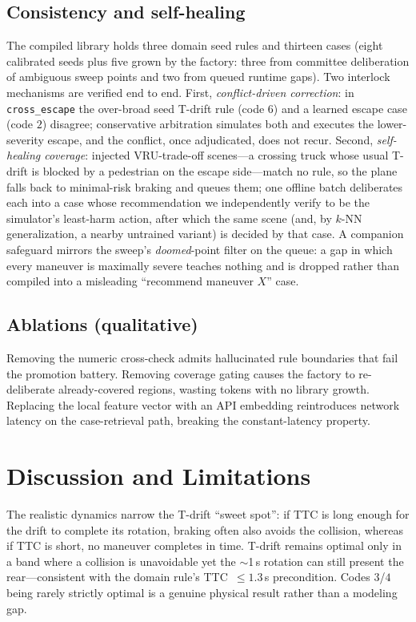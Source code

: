\documentclass[conference]{IEEEtran}
\begin{document}
\subsection{Consistency and self-healing}
The compiled library holds three domain seed rules and thirteen cases (eight
calibrated seeds plus five grown by the factory: three from committee
deliberation of ambiguous sweep points and two from queued runtime gaps). Two
interlock mechanisms are verified end to end. First, \emph{conflict-driven
correction}: in \texttt{cross\_escape} the over-broad seed T-drift rule (code
$6$) and a learned escape case (code $2$) disagree; conservative arbitration
simulates both and executes the lower-severity escape, and the conflict, once
adjudicated, does not recur. Second, \emph{self-healing coverage}: injected
VRU-trade-off scenes---a crossing truck whose usual T-drift is blocked by a
pedestrian on the escape side---match no rule, so the plane falls back to
minimal-risk braking and queues them; one offline batch deliberates each into
a case whose recommendation we independently verify to be the simulator's
least-harm action, after which the same scene (and, by $k$-NN generalization,
a nearby untrained variant) is decided by that case. A companion safeguard
mirrors the sweep's \emph{doomed}-point filter on the queue: a gap in which
every maneuver is maximally severe teaches nothing and is dropped rather than
compiled into a misleading ``recommend maneuver $X$'' case.

\subsection{Ablations (qualitative)}
Removing the numeric cross-check admits hallucinated rule boundaries that fail
the promotion battery. Removing coverage gating causes the factory to
re-deliberate already-covered regions, wasting tokens with no library growth.
Replacing the local feature vector with an API embedding reintroduces network
latency on the case-retrieval path, breaking the constant-latency property.

\section{Discussion and Limitations}

The realistic dynamics narrow the T-drift ``sweet spot'': if TTC is long
enough for the drift to complete its rotation, braking often also avoids the
collision, whereas if TTC is short, no maneuver completes in time. T-drift
remains optimal only in a band where a collision is unavoidable yet the
$\sim$1\,s rotation can still present the rear---consistent with the domain
rule's TTC~$\le 1.3$\,s precondition. Codes $3$/$4$ being rarely strictly
optimal is a genuine physical result rather than a modeling gap.
\end{document}
